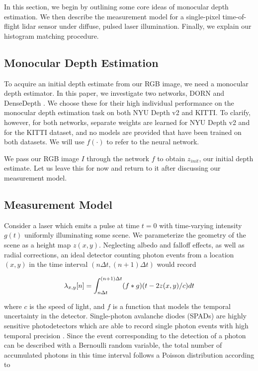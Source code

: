 In this section, we begin by outlining some core ideas of monocular depth
estimation. We then describe the measurement model for a single-pixel
time-of-flight lidar sensor under diffuse, pulsed laser illumination. 
Finally, we explain our histogram matching procedure.
\subsection{Monocular Depth Estimation}
To acquire an initial depth estimate from our RGB image, we need a monocular
depth estimator. In this paper, we investigate two networks, DORN \cite{Fu2018}
and DenseDepth \cite{Alhashim2018}. We choose these for their high individual
performance on the monocular depth estimation task on both NYU Depth v2 and
KITTI. To clarify, however, for both networks, separate weights are learned for
NYU Depth v2 and for the KITTI dataset, and no models are provided that have
been trained on both datasets. We will use $f(\cdot)$ to refer to the neural network.

We pass our RGB image $I$ through the network $f$ to obtain $z_{init}$, our
initial depth estimate.
Let us leave this for now and return to it after discussing our measurement
model. 
\subsection{Measurement Model}
Consider a laser which emits a pulse at time $t = 0$ with time-varying intensity
$g(t)$ uniformly illuminating some scene. We parameterize the geometry of the
scene as a height map $z(x, y)$.
Neglecting albedo and falloff effects, as well as radial corrections, an ideal detector counting photon events
from a location $(x,y)$ in the time interval $(n\Delta t, (n+1) \Delta t)$ would record

\begin{equation}
  \lambda_{x,y}[n] = \int_{n\Delta t}^{(n+1) \Delta t} (f * g)\paren*{t - 2z(x,y)/c} dt \label{single_loc_spad} 
\end{equation}  

where $c$ is the speed of light, and $f$ is a function that models the temporal uncertainty in the
detector. Single-photon avalanche diodes (SPADs) are highly sensitive
photodetectors which are able to record single photon events with high temporal
precision \cite{Stuff}. Since the event corresponding to the detection of a
photon can be described with a Bernoulli random variable,
the total number of accumulated photons in this time interval follows a Poisson
distribution according to

